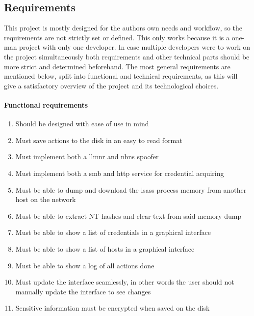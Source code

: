\documentclass{article}
\begin{document}
\subsection{Requirements}
\label{sec:requirements}
This project is mostly designed for the authors own needs and workflow, so the requirements are not strictly set or defined. This only works because it is a one-man project with only one developer. In case multiple developers were to work on the project simultaneously both requirements and other technical parts should be more strict and determined beforehand. The most general requirements are mentioned below, split into functional and technical requirements, as this will give a satisfactory overview of the project and its technological choices.
\paragraph{Functional requirements}
\begin{enumerate}
    \item Should be designed with ease of use in mind
    \item Must save actions to the disk in an easy to read format
    \item Must implement both a \gls{llmnr} and \gls{nbns} spoofer
    \item Must implement both a \gls{smb} and \gls{http} service for credential acquiring
    \item Must be able to dump and download the \gls{lsass} process memory from another host on the network
    \item Must be able to extract NT hashes and clear-text from said memory dump
    \item Must be able to show a list of credentials in a graphical interface
    \item Must be able to show a list of hosts in a graphical interface
    \item Must be able to show a log of all actions done
    \item Must update the interface seamlessly, in other words the user should not manually update the interface to see changes
    \item Sensitive information must be encrypted when saved on the disk
\end{enumerate}
\end{document}
